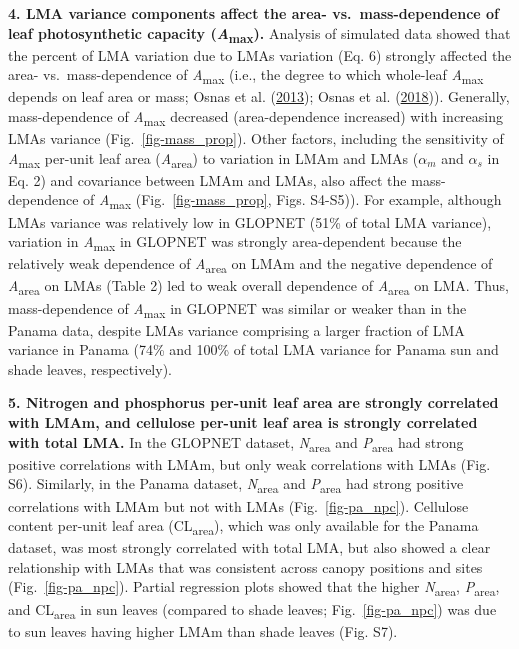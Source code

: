 \documentclass[
  12pt,
  letterpaper,
  DIV=11,
  numbers=noendperiod]{scrartcl}
\begin{document}
\textbf{4. LMA variance components affect the area- vs.~mass-dependence
of leaf photosynthetic capacity (\emph{A}\textsubscript{max}).} Analysis
of simulated data showed that the percent of LMA variation due to LMAs
variation (Eq. 6) strongly affected the area- vs.~mass-dependence of
\emph{A}\textsubscript{max} (i.e., the degree to which whole-leaf
\emph{A}\textsubscript{max} depends on leaf area or mass; Osnas et al.
(\protect\hyperlink{ref-Osnas2013}{2013}); Osnas et al.
(\protect\hyperlink{ref-Osnas2018}{2018})). Generally, mass-dependence
of \emph{A}\textsubscript{max} decreased (area-dependence increased)
with increasing LMAs variance (Fig.~\ref{fig-mass_prop}). Other factors,
including the sensitivity of \emph{A}\textsubscript{max} per-unit leaf
area (\emph{A}\textsubscript{area}) to variation in LMAm and LMAs
(\(\alpha_m\) and \(\alpha_s\) in Eq. 2) and covariance between LMAm and
LMAs, also affect the mass-dependence of \emph{A}\textsubscript{max}
(Fig.~\ref{fig-mass_prop}, Figs. S4-S5)). For example, although LMAs
variance was relatively low in GLOPNET (51\% of total LMA variance),
variation in \emph{A}\textsubscript{max} in GLOPNET was strongly
area-dependent because the relatively weak dependence of
\emph{A}\textsubscript{area} on LMAm and the negative dependence of
\emph{A}\textsubscript{area} on LMAs (Table 2) led to weak overall
dependence of \emph{A}\textsubscript{area} on LMA. Thus, mass-dependence
of \emph{A}\textsubscript{max} in GLOPNET was similar or weaker than in
the Panama data, despite LMAs variance comprising a larger fraction of
LMA variance in Panama (74\% and 100\% of total LMA variance for Panama
sun and shade leaves, respectively).

\textbf{5. Nitrogen and phosphorus per-unit leaf area are strongly
correlated with LMAm, and cellulose per-unit leaf area is strongly
correlated with total LMA.} In the GLOPNET dataset,
\emph{N}\textsubscript{area} and \emph{P}\textsubscript{area} had strong
positive correlations with LMAm, but only weak correlations with LMAs
(Fig. S6). Similarly, in the Panama dataset,
\emph{N}\textsubscript{area} and \emph{P}\textsubscript{area} had strong
positive correlations with LMAm but not with LMAs
(Fig.~\ref{fig-pa_npc}). Cellulose content per-unit leaf area
(CL\textsubscript{area}), which was only available for the Panama
dataset, was most strongly correlated with total LMA, but also showed a
clear relationship with LMAs that was consistent across canopy positions
and sites (Fig.~\ref{fig-pa_npc}). Partial regression plots showed that
the higher \emph{N}\textsubscript{area}, \emph{P}\textsubscript{area},
and CL\textsubscript{area} in sun leaves (compared to shade leaves;
Fig.~\ref{fig-pa_npc}) was due to sun leaves having higher LMAm than
shade leaves (Fig. S7).
\end{document}
